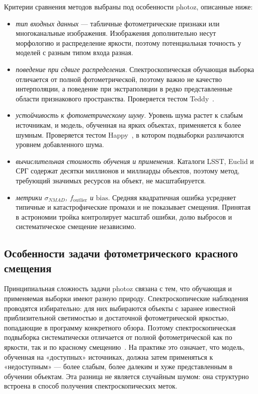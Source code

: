 \documentclass[12pt,a4paper]{article}
\begin{document}
Критерии сравнения методов выбраны под особенности photoz, описанные ниже:
\begin{itemize}
    \item \emph{тип входных данных} — табличные фотометрические признаки или многоканальные изображения. Изображения дополнительно несут морфологию и распределение яркости, поэтому потенциальная точность у моделей с разным типом входа разная.

    \item \emph{поведение при сдвиге распределения}. Спектроскопическая обучающая выборка отличается от полной фотометрической, поэтому важно не качество интерполяции, а поведение при экстраполяции в редко представленные области признакового пространства. Проверяется тестом Teddy~\cite{beck2017}.

    \item \emph{устойчивость к фотометрическому шуму}. Уровень шума растет к слабым источникам, и модель, обученная на ярких объектах, применяется к более шумным. Проверяется тестом Happy~\cite{beck2017}, в котором подвыборки различаются уровнем добавленного шума.

    \item \emph{вычислительная стоимость обучения и применения}. Каталоги LSST, Euclid и СРГ содержат десятки миллионов и миллиарды объектов, поэтому метод, требующий значимых ресурсов на объект, не масштабируется.

    \item \emph{метрики $\sigma_{NMAD}$, $f_{\mathrm{outlier}}$ и $\mathrm{bias}$}. Средняя квадратичная ошибка усредняет типичные и катастрофические промахи и не показывает смещения. Принятая в астрономии тройка контролирует масштаб ошибки, долю выбросов и систематическое смещение независимо.
\end{itemize}

\subsection{Особенности задачи фотометрического красного смещения}
\label{sec:photoz-challenges}

Принципиальная сложность задачи photoz связана с тем, что обучающая и применяемая выборки имеют разную природу. Спектроскопические наблюдения проводятся избирательно: для них выбираются объекты с заранее известной приблизительной светимостью и достаточной фотометрической яркостью, попадающие в программу конкретного обзора. Поэтому спектроскопическая подвыборка систематически отличается от полной фотометрической как по яркости, так и по красному смещению~\cite{newman2022}. На практике это означает, что модель, обученная на «доступных» источниках, должна затем применяться к «недоступным» — более слабым, более далеким и хуже представленным в обучении объектам. Эта разница не является случайным шумом: она структурно встроена в способ получения спектроскопических меток.
\end{document}
